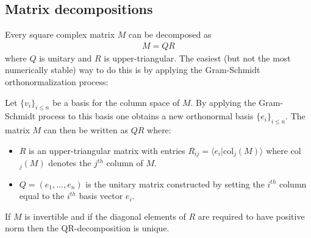 \subsection{Matrix decompositions}

    \begin{method}[QR Decomposition]
        Every square complex matrix $M$ can be decomposed as
        \begin{gather}
            M = QR
        \end{gather}
        where $Q$ is unitary and $R$ is upper-triangular. The easiest (but not the most numerically stable) way to do this is by applying the Gram-Schmidt orthonormalization process:

        \qquad Let $\{v_i\}_{i\leq n}$ be a basis for the column space of $M$. By applying the Gram-Schmidt process to this basis one obtains a new orthonormal basis $\{e_i\}_{i\leq n}$. The matrix $M$ can then be written as $QR$ where:
        \begin{itemize}
            \item $R$ is an upper-triangular matrix with entries $R_{ij} = \langle e_i|\text{col}_j(M) \rangle$ where col$_j(M)$ denotes the $j^{th}$ column of $M$.
            \item $Q = (e_1,\ldots,e_n)$ is the unitary matrix constructed by setting the $i^{th}$ column equal to the $i^{th}$ basis vector $e_i$.
        \end{itemize}
    \end{method}
    \begin{property}
        If $M$ is invertible and if the diagonal elements of $R$ are required to have positive norm then the QR-decomposition is unique.
    \end{property}